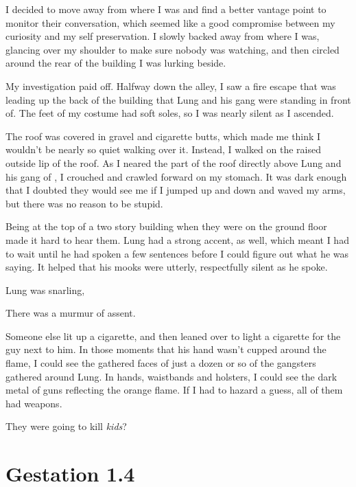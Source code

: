 I decided to move away from where I was and find a better vantage point to monitor their conversation, which seemed like a good compromise between my curiosity and my self preservation. I slowly backed away from where I was, glancing over my shoulder to make sure nobody was watching, and then circled around the rear of the building I was lurking beside.

My investigation paid off. Halfway down the alley, I saw a fire escape that was leading up the back of the building that Lung and his gang were standing in front of. The feet of my costume had soft soles, so I was nearly silent as I ascended.

The roof was covered in gravel and cigarette butts, which made me think I wouldn't be nearly so quiet walking over it. Instead, I walked on the raised outside lip of the roof. As I neared the part of the roof directly above Lung and his gang of , I crouched and crawled forward on my stomach. It was dark enough that I doubted they would see me if I jumped up and down and waved my arms, but there was no reason to be stupid.

Being at the top of a two story building when they were on the ground floor made it hard to hear them. Lung had a strong accent, as well, which meant I had to wait until he had spoken a few sentences before I could figure out what he was saying. It helped that his mooks were utterly, respectfully silent as he spoke.

Lung was snarling, 

There was a murmur of assent.

Someone else lit up a cigarette, and then leaned over to light a cigarette for the guy next to him. In those moments that his hand wasn't cupped around the flame, I could see the gathered faces of just a dozen or so of the gangsters gathered around Lung. In hands, waistbands and holsters, I could see the dark metal of guns reflecting the orange flame. If I had to hazard a guess, all of them had weapons.

They were going to kill {\em kids}?


\chapter{Gestation 1.4}

